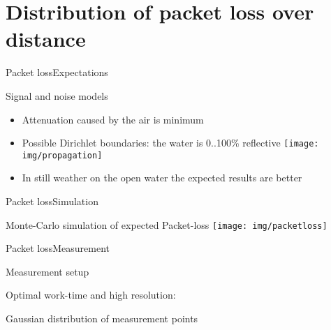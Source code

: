 \section{Distribution of packet loss over distance}
\begin{frame}{Packet loss}{Expectations}
    \begin{block}{Signal and noise models}
    \begin{itemize}
		\item Attenuation caused by the air is minimum
		\item Possible Dirichlet boundaries: the water is 0..100\% reflective
		\texttt{[image: img/propagation]}
		\item In still weather on the open water the expected results are better
    \end{itemize}
    \end{block}
\end{frame}
\begin{frame}{Packet loss}{Simulation}
    \begin{block}{Monte-Carlo simulation of expected Packet-loss}
    \texttt{[image: img/packetloss]}
    \end{block}
\end{frame}

\begin{frame}{Packet loss}{Measurement}
    \begin{block}{Measurement setup}
		\item Optimal work-time and high resolution:
		\item Gaussian distribution of measurement points
		
    \end{block}
\end{frame}
